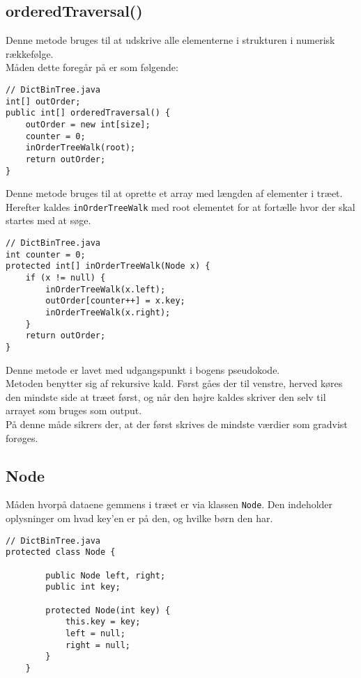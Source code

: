 \documentclass{article}
\begin{document}
\subsection*{orderedTraversal()}
Denne metode bruges til at udskrive alle elementerne i strukturen i numerisk rækkefølge.\\
Måden dette foregår på er som følgende:
\begin{lstlisting}
// DictBinTree.java
int[] outOrder;
public int[] orderedTraversal() {
    outOrder = new int[size];
    counter = 0;
    inOrderTreeWalk(root);
    return outOrder;
}
\end{lstlisting}
\bigskip
Denne metode bruges til at oprette et array med længden af elementer i træet. Herefter kaldes \texttt{inOrderTreeWalk} med root elementet for at fortælle hvor der skal startes med at søge.
\begin{lstlisting}
// DictBinTree.java
int counter = 0;
protected int[] inOrderTreeWalk(Node x) {
	if (x != null) {
		inOrderTreeWalk(x.left);
		outOrder[counter++] = x.key;
		inOrderTreeWalk(x.right);
	}
	return outOrder;
}
\end{lstlisting}
\bigskip
Denne metode er lavet med udgangspunkt i bogens pseudokode.\\
Metoden benytter sig af rekursive kald. Først gåes der til venstre, herved køres den mindste side at træet først, og når den højre kaldes skriver den selv til arrayet som bruges som output.\\
På denne måde sikrers der, at der først skrives de mindste værdier som gradvist forøges. 
\subsection*{Node}
Måden hvorpå dataene gemmens i træet er via klassen \texttt{Node}. Den indeholder oplysninger om hvad key'en er på den, og hvilke børn den har.
\begin{lstlisting}
// DictBinTree.java
protected class Node {

        public Node left, right;
        public int key;
        
        protected Node(int key) {
            this.key = key;
            left = null;
            right = null;
        }
    }
\end{lstlisting}
\bigskip
\newpage
\end{document}
